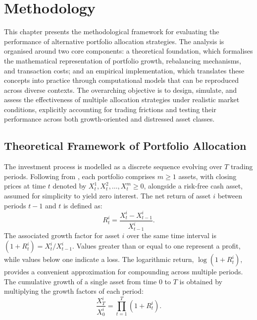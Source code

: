 \documentclass[12pt,a4paper]{report}
\begin{document}
\chapter{Methodology}

This chapter presents the methodological framework for evaluating the performance of alternative portfolio allocation strategies. The analysis is organised around two core components: a theoretical foundation, which formalises the mathematical representation of portfolio growth, rebalancing mechanisms, and transaction costs; and an empirical implementation, which translates these concepts into practice through computational models that can be reproduced across diverse contexts. The overarching objective is to design, simulate, and assess the effectiveness of multiple allocation strategies under realistic market conditions, explicitly accounting for trading frictions and testing their performance across both growth-oriented and distressed asset classes.

\section{Theoretical Framework of Portfolio Allocation}
\label{sec:theory}

The investment process is modelled as a discrete sequence evolving over \( T \) trading periods. Following from \citet{Markowitz1952}, each portfolio comprises \( m \geq 1 \) assets, with closing prices at time \( t \) denoted by \( X_t^1, X_t^2, \ldots, X_t^m \geq 0 \), alongside a risk-free cash asset, assumed for simplicity to yield zero interest. The net return of asset \( i \) between periods \( t-1 \) and \( t \) is defined as:
\begin{equation}
R^i_t = \frac{X^i_t - X^i_{t-1}}{X^i_{t-1}}.
\label{eq:returns}
\end{equation}
The associated growth factor for asset \( i\) over the same time interval is \( (1 + R^i_t) = X^i_t / X^i_{t-1} \). Values greater than or equal to one represent a profit, while values below one indicate a loss. The logarithmic return, \( \log(1 + R^i_t) \), provides a convenient approximation for compounding across multiple periods. The cumulative growth of a single asset from time \( 0 \) to \( T \) is obtained by multiplying the growth factors of each period:
\begin{equation}
\frac{X_T^i}{X_0^i} = \prod_{t=1}^{T} (1 + R^i_t).
\label{eq:cumgrowth}
\end{equation}
\end{document}

